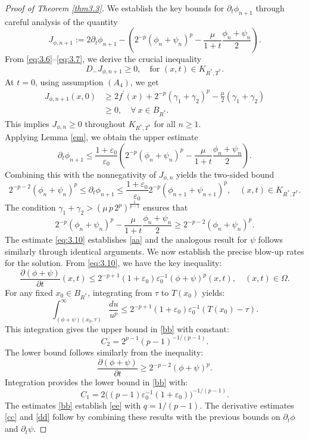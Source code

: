\documentclass[
  sn-mathphys-num,
  colorlinks,
  linkcolor=darkmagenta,
  citecolor=rufous,
  urlcolor=zaffre,
  hypertexnames=false
]{sn-jnl}
\numberwithin{equation}{section}
\begin{document}
\begin{proof}[Proof of Theorem \ref{thm3.3}]
We establish the key bounds for $\partial_t \phi_{n+1}$ through careful analysis of the quantity
$$
J_{\phi,n+1} := 2\partial_t\phi_{n+1} - \left(2^{-p}(\phi_n+\psi_n)^p - \frac{\mu}{1+t}\frac{\phi_n+\psi_n}{2}\right).
$$
From \eqref{eq:3.6}--\eqref{eq:3.7}, we derive the crucial inequality
\begin{equation}
\label{eq:3.8}
D_- J_{\phi,n+1} \geq 0, \quad \text{for } (x,t) \in K_{R^*,T^*}.
\end{equation}
At $t=0$, using assumption $(A_4)$, we get  
\begin{equation}
\label{eq:3.9}
\begin{aligned}
J_{\phi,n+1}(x,0) &\geq 2f^\prime(x) + 2^{-p}(\gamma_1 + \gamma_2)^p - \frac{\mu}{2}(\gamma_1 + \gamma_2) \\
&\geq 0, \quad \forall \ x \in B_{R^*}.
\end{aligned}
\end{equation}
This implies $J_{\phi,n} \geq 0$ throughout $K_{R^*,T^*}$ for all $n \geq 1$.\\
Applying Lemma \ref{em}, we obtain the upper estimate
$$
\partial_t\phi_{n+1} \leq \frac{1+\varepsilon_0}{\varepsilon_0} \left(2^{-p}(\phi_n+\psi_n)^p - \frac{\mu}{1+t}\frac{\phi_n+\psi_n}{2}\right).
$$
Combining this with the nonnegativity of $J_{\phi,n}$ yields the two-sided bound
\begin{equation}
\label{eq:3.10}
2^{-p-2}(\phi_n+\psi_n)^p  \leq \partial_t\phi_{n+1} \leq \frac{1+\varepsilon_0}{\varepsilon_0} 2^{-p}(\phi_{n+1}+\psi_{n+1})^p,
\quad (x,t) \in K_{R^*,T^*}.
\end{equation}
The condition $\gamma_1+\gamma_2 > (\mu\,p\,2^{p})^{\frac{1}{p-1}}
$ ensures that $$2^{-p}(\phi_n+\psi_n)^p - \frac{\mu}{1+t}\frac{\phi_n+\psi_n}{2}\geq 2^{-p-2}(\phi_n+\psi_n)^p.$$ 
The estimate \eqref{eq:3.10} establishes \eqref{aa} and the analogous result for $\psi$ follows similarly through identical arguments.
We now establish the precise blow-up rates for the solution.
From \eqref{eq:3.10}, we have the key inequality:
$$
\frac{\partial(\phi+\psi)}{\partial t}(x,t) \leq 2^{-p+1}(1+\varepsilon_0)\varepsilon_0^{-1}(\phi+\psi)^p(x,t), \quad (x,t)\in\Omega.
$$
For any fixed $x_0 \in B_{R^*}$, integrating from $\tau$ to $T(x_0)$ yields:
$$
\int_{(\phi+\psi)(x_0,\tau)}^{\infty} \frac{du}{u^p} \leq 2^{-p+1}(1+\varepsilon_0)\varepsilon_0^{-1} (T(x_0)-\tau).
$$
This integration gives the upper bound in \eqref{bb} with constant:
$$
C_2 = 2^{p-1}(p-1)^{-1/(p-1)}.
$$
The lower bound follows similarly from the inequality:
$$
\frac{\partial(\phi+\psi)}{\partial t} \geq 2^{-p-2}(\phi+\psi)^p.
$$
Integration provides the lower bound in \eqref{bb} with:
$$
C_1 = 2\bigl((p-1)\varepsilon_0^{-1}(1+\varepsilon_0)\bigr)^{-1/(p-1)}.
$$
The estimates \eqref{bb} establish \eqref{ee} with $q=1/(p-1)$. The derivative estimates \eqref{cc} and \eqref{dd} follow by combining these results with the previous bounds on $\partial_t\phi$ and $\partial_t\psi$. 
\end{proof}
\end{document}

